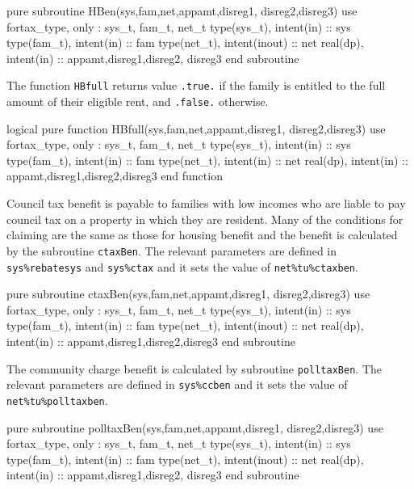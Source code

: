 \documentclass[11pt,thmsa,letter,ukenglish]{article}
\begin{document}
\begin{fortrancode}
pure subroutine HBen(sys,fam,net,appamt,disreg1, disreg2,disreg3)
    use fortax_type, only : sys_t, fam_t, net_t
    type(sys_t), intent(in)    :: sys
    type(fam_t), intent(in)    :: fam
    type(net_t), intent(inout) :: net
    real(dp),    intent(in)    :: appamt,disreg1,disreg2, disreg3
end subroutine
\end{fortrancode}

\noindent The function \texttt{HBfull} returns value \texttt{.true.} if the family is entitled to the full amount of their eligible rent, and \texttt{.false.} otherwise.

\begin{fortrancode}
logical pure function HBfull(sys,fam,net,appamt,disreg1, disreg2,disreg3)
    use fortax_type, only : sys_t, fam_t, net_t
    type(sys_t), intent(in) :: sys
    type(fam_t), intent(in) :: fam
    type(net_t), intent(in) :: net
    real(dp),    intent(in) :: appamt,disreg1,disreg2,disreg3
end function
\end{fortrancode}

\noindent Council tax benefit is payable to families with low incomes who are liable to pay council tax on a property in which they are resident. Many of the conditions for claiming are the same as those for housing benefit and the benefit is calculated by the subroutine \texttt{ctaxBen}. The relevant parameters are defined in \texttt{sys\%rebatesys} and \texttt{sys\%ctax} and it sets the value of \texttt{net\%tu\%ctaxben}.

\begin{fortrancode}
pure subroutine ctaxBen(sys,fam,net,appamt,disreg1, disreg2,disreg3)
    use fortax_type, only : sys_t, fam_t, net_t
    type(sys_t), intent(in)    :: sys
    type(fam_t), intent(in)    :: fam
    type(net_t), intent(inout) :: net
    real(dp),    intent(in)    :: appamt,disreg1,disreg2,disreg3
end subroutine
\end{fortrancode}

\noindent The community charge benefit is calculated by subroutine \texttt{polltaxBen}. The relevant parameters are defined in \texttt{sys\%ccben} and it sets the value of \texttt{net\%tu\%polltaxben}.

\begin{fortrancode}
pure subroutine polltaxBen(sys,fam,net,appamt,disreg1, disreg2,disreg3)
    use fortax_type, only : sys_t, fam_t, net_t
    type(sys_t), intent(in)    :: sys
    type(fam_t), intent(in)    :: fam
    type(net_t), intent(inout) :: net
    real(dp),    intent(in)    :: appamt,disreg1,disreg2, disreg3
end subroutine
\end{fortrancode}
\end{document}
